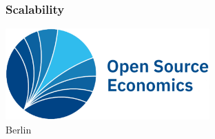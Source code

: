 \begin{frame}[standout]\frametitle{Scalability}\vspace{1cm}

\hspace{3cm}\includegraphics[height=3.5cm]{material/crop-ose-logo.pdf}\\[-1cm]
\hspace{7.45cm}\textcolor{OSEBlue}{\fontsize{23pt}{20pt}\selectfont Berlin}

\end{frame}

\backupend

%
%
%
%
%
